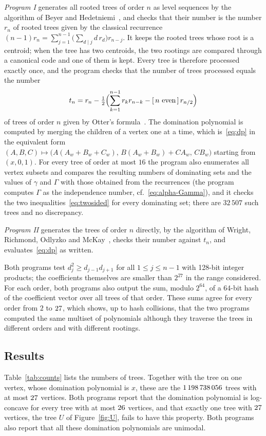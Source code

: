 \emph{Program I} generates all rooted trees of order $n$ as level sequences
by the algorithm of Beyer and Hedetniemi~\cite{BH}, and checks that their
number is the number $r_n$ of rooted trees given by the classical recurrence
$(n-1)r_n=\sum_{j=1}^{n-1}\bigl(\sum_{d\mid j}d\,r_d\bigr)r_{n-j}$. It
keeps the rooted trees whose root is a centroid; when the tree has two
centroids, the two rootings are compared through a canonical code and one of
them is kept. Every tree is therefore processed exactly once, and the program
checks that the number of trees processed equals the number
\[
  t_n=r_n-\tfrac12\Bigl(\sum_{k=1}^{n-1}r_kr_{n-k}-[\,n\text{ even}\,]\,r_{n/2}\Bigr)
\]
of trees of order $n$ given by Otter's formula~\cite{Otter}. The domination
polynomial is computed by merging the children of a vertex one at a time,
which is~\eqref{eq:dp} in the equivalent form
$(A,B,C)\mapsto\bigl(A(A_w+B_w+C_w),\,B(A_w+B_w)+CA_w,\,CB_w\bigr)$ starting
from $(x,0,1)$. For every tree of order at most $16$ the program also
enumerates all vertex subsets and compares the resulting numbers of
dominating sets and the values of $\gamma$ and $\Gamma$ with those obtained
from the recurrences (the program computes $\Gamma$ as the independence
number, cf.~\eqref{eq:alpha-Gamma}), and it checks the two
inequalities~\eqref{eq:twosided} for every dominating set; there are $32\,507$ such trees and no
discrepancy.

\emph{Program II} generates the trees of order $n$ directly, by the
algorithm of Wright, Richmond, Odlyzko and McKay~\cite{WROM}, checks their
number against $t_n$, and evaluates~\eqref{eq:dp} as written.

Both programs test $d_j^2\ge d_{j-1}d_{j+1}$ for all $1\le j\le n-1$ with
128-bit integer products; the coefficients themselves are smaller than
$2^{27}$ in the range considered. For each order, both programs also output the
sum, modulo $2^{64}$, of a 64-bit hash of the coefficient vector over all
trees of that order. These sums agree for every order from $2$ to $27$,
which shows, up to hash collisions, that the two programs computed the same
multiset of polynomials although they traverse the trees in different orders
and with different rootings.

\subsection*{Results}
Table~\ref{tab:counts} lists the numbers of trees. Together with the tree on
one vertex, whose domination polynomial is $x$, these are the $1\,198\,738\,056$
trees with at most $27$ vertices. Both programs report
that the domination polynomial is log-concave for every tree with at most
$26$ vertices, and that exactly one tree with $27$ vertices, the
tree $U$ of Figure~\ref{fig:U}, fails to have this property. Both programs
also report that all these domination polynomials are unimodal.

